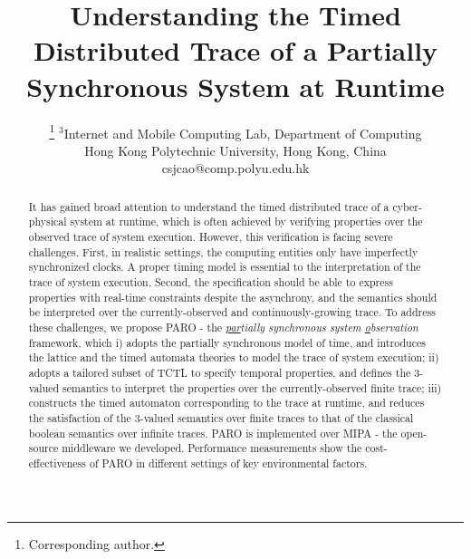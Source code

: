 \documentclass[10pt,conference,compsocconf,letterpaper]{IEEEtran}
\begin{document}
\title{Understanding the Timed Distributed Trace of a Partially Synchronous System at Runtime}

\author{
\thanks{Corresponding author.}
$^3$Internet and Mobile Computing Lab, Department of Computing\\
Hong Kong Polytechnic University, Hong Kong, China\\
csjcao@comp.polyu.edu.hk
}

\maketitle

\begin{abstract}
    It has gained broad attention to understand the timed distributed trace of a cyber-physical system at runtime, which is often achieved by verifying properties over the observed trace of system execution. However, this verification is facing severe challenges. First, in realistic settings, the computing entities only have imperfectly synchronized clocks. A proper timing model is essential to the interpretation of the trace of system execution. Second, the specification should be able to express properties with real-time constraints despite the asynchrony, and the semantics should be interpreted over the currently-observed and continuously-growing trace. To address these challenges, we propose \textsf{PARO} - the \textit{\underline{par}tially synchronous system \underline{o}bservation} framework, which i) adopts the partially synchronous model of time, and introduces the lattice and the timed automata theories to model the trace of system execution; ii) adopts a tailored subset of TCTL to specify temporal properties, and defines the 3-valued semantics to interpret the properties over the currently-observed finite trace; iii) constructs the timed automaton corresponding to the trace at runtime, and reduces the satisfaction of the 3-valued semantics over finite traces to that of the classical boolean semantics over infinite traces. \textsf{PARO} is implemented over MIPA - the open-source middleware we developed. Performance measurements show the cost-effectiveness of \textsf{PARO} in different settings of key environmental factors.
\end{abstract}
\end{document}
